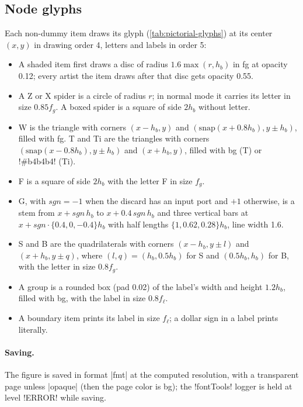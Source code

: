 {\subsection{Node glyphs}\label{sec:pictorial-figure-glyphs}

Each non-dummy item draws its glyph (\cref{tab:pictorial-glyphs}) at its center $(x,y)$ in
drawing order 4, letters and labels in order 5:
\begin{itemize}
  \item A shaded item first draws a disc of radius $1.6\max(r,h_b)$ in fg at opacity 0.12; every
    artist the item draws after that disc gets opacity 0.55.
  \item A Z or X spider is a circle of radius $r$; in normal mode it carries its letter in size
    $0.85f_g$. A boxed spider is a square of side $2h_b$ without letter.
  \item W is the triangle with corners $(x-h_b,y)$ and $(\mathrm{snap}(x+0.8h_b), y\pm h_b)$,
    filled with fg. T and Ti are the triangles with corners $(\mathrm{snap}(x-0.8h_b), y\pm
    h_b)$ and $(x+h_b,y)$, filled with bg (T) or \code!#b4b4b4! (Ti).
  \item F is a square of side $2h_b$ with the letter F in size $f_g$.
  \item G, with $\mathit{sgn} = -1$ when the discard has an input port and $+1$ otherwise, is a
    stem from $x+\mathit{sgn}\,h_b$ to $x+0.4\,\mathit{sgn}\,h_b$ and three vertical bars at
    $x + \mathit{sgn}\cdot\{0.4, 0, -0.4\}h_b$ with half lengths $\{1, 0.62, 0.28\}h_b$, line
    width 1.6.
  \item S and B are the quadrilaterals with corners $(x-h_b, y\pm l)$ and $(x+h_b, y\pm q)$,
    where $(l, q) = (h_b, 0.5h_b)$ for S and $(0.5h_b, h_b)$ for B, with the letter in size
    $0.8f_g$.
  \item A group is a rounded box (pad 0.02) of the label's width and height $1.2h_b$, filled
    with bg, with the label in size $0.8f_\ell$.
  \item A boundary item prints its label in size $f_\ell$; a dollar sign in a label prints
    literally.
\end{itemize}

\paragraph{Saving.} The figure is saved in format \py|fmt| at the computed resolution, with a
transparent page unless \py|opaque| (then the page color is bg); the \code!fontTools! logger is
held at level \code!ERROR! while saving.

}
